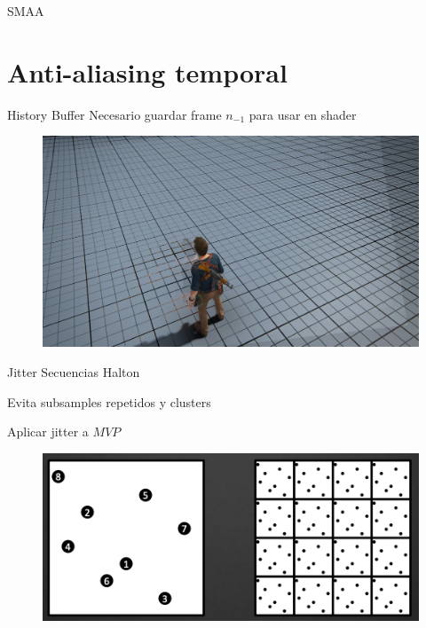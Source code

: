 \documentclass[table]{beamer}
\begin{document}
\begin{frame}[fragile]{SMAA}
\begin{figure}[!htbp]
\begin{subfigure}[b]{0.45\textwidth}
        \end{subfigure}
    \end{figure}
\end{frame}


\section{Anti-aliasing temporal}

\begin{frame}[fragile]{History Buffer}
    Necesario guardar frame $n_{-1}$ para usar en shader

    \begin{figure}
        \includegraphics[width=\linewidth]{./figures/reprojection.png}
    \end{figure}
\end{frame}
\begin{frame}[fragile]{Jitter}
    Secuencias Halton

    Evita subsamples repetidos y clusters

    Aplicar jitter a $MVP$

    \begin{figure}
        \includegraphics[width=\linewidth]{./figures/halton.png}
    \end{figure}
\end{frame}
\end{document}

